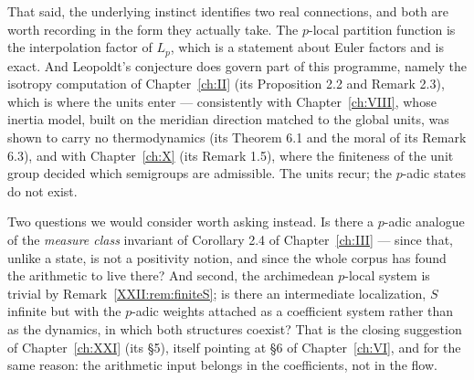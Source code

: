 That said, the underlying instinct identifies two real connections, and both are worth
recording in the form they actually take. The $p$-local partition function is the
interpolation factor of $L_p$, which is a statement about Euler factors and is exact.
And Leopoldt's conjecture does govern part of this programme, namely the isotropy computation
of Chapter~\ref{ch:II} (its Proposition 2.2 and Remark 2.3), which is where the units enter --- consistently with
Chapter~\ref{ch:VIII}, whose inertia model, built on the meridian direction matched to the global
units, was shown to carry no thermodynamics (its Theorem 6.1 and the moral of its
Remark 6.3), and with Chapter~\ref{ch:X} (its Remark 1.5), where the finiteness of the unit group
decided which semigroups are admissible. The units recur; the $p$-adic states do not exist.

Two questions we would consider worth asking instead. Is there a $p$-adic analogue of the
\emph{measure class} invariant of Corollary 2.4 of Chapter~\ref{ch:III} --- since that, unlike a state,
is not a positivity notion, and since the whole corpus has found the arithmetic to live
there? And second, the archimedean $p$-local system is trivial by
Remark~\ref{XXII:rem:finiteS}; is there an intermediate localization, $S$ infinite but with the
$p$-adic weights attached as a coefficient system rather than as the dynamics, in which both
structures coexist? That is the closing suggestion of Chapter~\ref{ch:XXI} (its \S5), itself pointing
at \S6 of Chapter~\ref{ch:VI}, and for the same
reason: the arithmetic input belongs in the coefficients, not in the flow.

